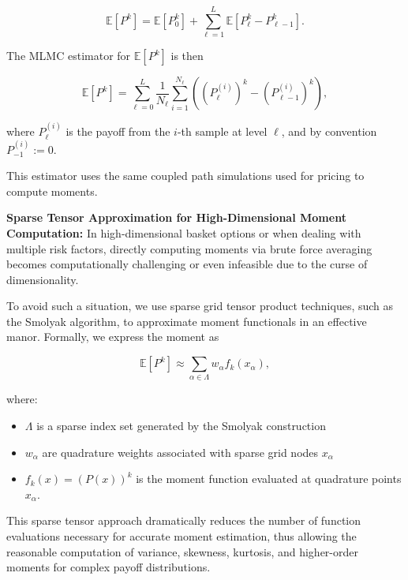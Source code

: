 \documentclass[titlepage]{article}
\begin{document}
\begin{equation}\label{eq:moment-mlmc}
\mathbb{E}[P^k] = \mathbb{E}[P_0^k] + \sum_{\ell=1}^L \mathbb{E}\left[P_\ell^k - P_{\ell-1}^k \right].
\end{equation}

The MLMC estimator for \(\mathbb{E}[P^k]\) is then

\begin{equation}\label{eq:moment-mlmc-estimator}
\widehat{\mathbb{E}}[P^k] = \sum_{\ell=0}^L \frac{1}{N_\ell} \sum_{i=1}^{N_\ell} \left( (P_\ell^{(i)})^k - (P_{\ell-1}^{(i)})^k \right),
\end{equation}

where \(P_\ell^{(i)}\) is the payoff from the \(i\)-th sample at level \(\ell\), and by convention \(P_{-1}^{(i)} := 0\).

This estimator uses the same coupled path simulations used for pricing to compute moments.

\vspace{6pt}
\noindent \textbf{Sparse Tensor Approximation for High-Dimensional Moment Computation:}  
In high-dimensional basket options or when dealing with multiple risk factors, directly computing moments via brute force averaging becomes computationally challenging or even infeasible due to the curse of dimensionality.

To avoid such a situation, we use sparse grid tensor product techniques, such as the Smolyak algorithm, to approximate moment functionals in an effective manor. Formally, we express the moment as

\[
\mathbb{E}[P^k] \approx \sum_{\alpha \in \Lambda} w_\alpha f_k(x_\alpha),
\]

where:
\begin{itemize}
\item \(\Lambda\) is a sparse index set generated by the Smolyak construction
\item \(w_\alpha\) are quadrature weights associated with sparse grid nodes \(x_\alpha\)
\item \(f_k(x) = (P(x))^k\) is the moment function evaluated at quadrature points \(x_\alpha\).
\end{itemize}
This sparse tensor approach dramatically reduces the number of function evaluations necessary for accurate moment estimation, thus allowing the reasonable computation of variance, skewness, kurtosis, and higher-order moments for complex payoff distributions.
\end{document}
